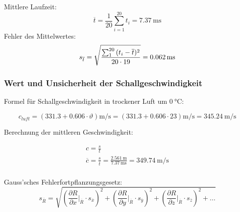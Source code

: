 Mittlere Laufzeit:
\begin{equation}
    \overline{t} = \frac{1}{20} \sum_{i=1}^{20} t_i = \SI{7.37}{\milli\second}
\end{equation}
Fehler des Mittelwertes:
\begin{equation}
    s_{\overline{t}} = \sqrt{ \frac{\sum_{1}^{20}{(t_i-\overline{t})^2}}{20 \cdot 19}} = \SI{0.062}{\milli\second} \\
\end{equation}

\subsubsection{Wert und Unsicherheit der Schallgeschwindigkeit}

Formel f\"ur Schallgeschwindigkeit in trockener Luft um $\SI{0}{\celsius}$:

\begin{equation}
    c_{luft} = (331.3 + 0.606 \cdot \vartheta) \si{\meter\per\second} = (331.3 + 0.606 \cdot 23) \si{\meter\per\second} = \SI{345.24}{\meter\per\second}
\end{equation}

Berechnung der mittleren Geschwindigkeit:

\begin{gather}
    c = \frac{s}{t} \\
    \overline{c} = \frac{s}{\overline{t}} = \frac{\SI{2.561}{\meter}}{\SI{7.37}{\milli\second}} = \SI{349.74}{\meter\per\second} \\
\end{gather}

Gauss'sches Fehlerfortpflanzungsgesetz:
\begin{equation}
    s_{\overline{R}} = \sqrt{ \left( \frac{\partial R}{\partial x} \biggr\rvert_{\overline{R}} \cdot s_{\overline{x}}\right)^2
                            + \left( \frac{\partial R}{\partial y} \biggr\rvert_{\overline{R}} \cdot s_{\overline{y}}\right)^2
                            + \left( \frac{\partial R}{\partial z} \biggr\rvert_{\overline{R}} \cdot s_{\overline{z}}\right)^2
                            + ... }
\end{equation}

